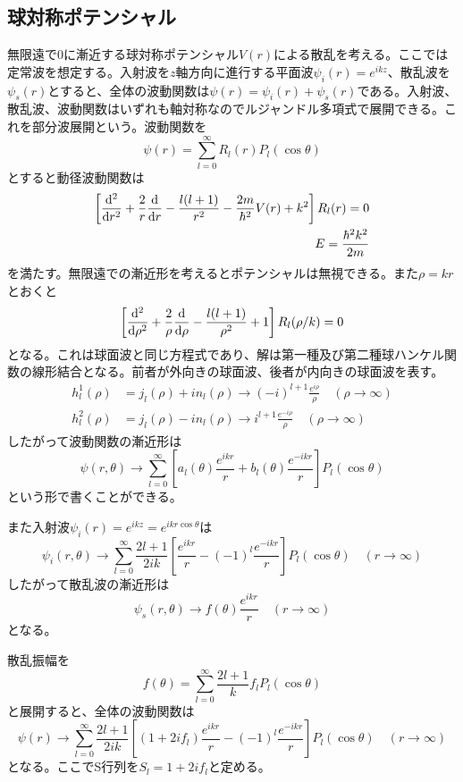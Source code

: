 \subsection{球対称ポテンシャル}
    無限遠で0に漸近する球対称ポテンシャル$V(r)$による散乱を考える。ここでは定常波を想定する。入射波を$z$軸方向に進行する平面波$\psi_i(r) = e^{ikz}$、散乱波を$\psi_s(r)$とすると、全体の波動関数は$\psi(r) = \psi_i(r) + \psi_s(r)$である。入射波、散乱波、波動関数はいずれも軸対称なのでルジャンドル多項式で展開できる。これを部分波展開という。波動関数を
        \[\psi(r) = \sum_{l = 0}^\infty R_l(r)P_l(\cos\theta)\]
    とすると動径波動関数は
    \begin{align*}
        \left[\dv[2]{r} + \frac{2}{r}\dv{r} - \frac{l(l + 1)}{r^2} - \frac{2m}{\hbar^2}V(r) + k^2\right]R_l(r) = 0\\
        E = \frac{\hbar^2k^2}{2m}
    \end{align*}
    を満たす。無限遠での漸近形を考えるとポテンシャルは無視できる。また$\rho = kr$とおくと
        \[\left[\dv[2]{\rho} + \frac{2}{\rho}\dv{\rho} - \frac{l(l + 1)}{\rho^2} + 1\right]R_l(\rho/k) = 0\]
    となる。これは球面波と同じ方程式であり、解は第一種及び第二種球ハンケル関数の線形結合となる。前者が外向きの球面波、後者が内向きの球面波を表す。
    \begin{align*}
        h_l^1(\rho) &= j_l(\rho) + in_l(\rho) \to (-i)^{l+1}\frac{e^{i\rho}}{\rho} \quad (\rho \to \infty)\\
        h_l^2(\rho) &= j_l(\rho) - in_l(\rho) \to i^{l+1}\frac{e^{-i\rho}}{\rho} \quad (\rho \to \infty)
    \end{align*}
    したがって波動関数の漸近形は
        \[\psi(r, \theta) \to \sum_{l = 0}^\infty \left[a_l(\theta)\frac{e^{ikr}}{r} + b_l(\theta)\frac{e^{-ikr}}{r}\right]P_l(\cos\theta)\]
    という形で書くことができる。
    
    また入射波$\psi_i(r) = e^{ikz} = e^{ikr\cos\theta}$は
        \[\psi_i(r, \theta) \to \sum_{l = 0}^\infty \frac{2l + 1}{2ik}\left[\frac{e^{ikr}}{r} - (-1)^l\frac{e^{-ikr}}{r}\right]P_l(\cos\theta) \quad (r \to \infty)\]
    したがって散乱波の漸近形は
        \[\psi_s(r, \theta) \to f(\theta)\frac{e^{ikr}}{r} \quad (r \to \infty)\]
    となる。

    散乱振幅を
        \[f(\theta) = \sum_{l = 0}^\infty \frac{2l + 1}{k}f_lP_l(\cos\theta)\]
    と展開すると、全体の波動関数は
        \[\psi(r) \to \sum_{l = 0}^\infty \frac{2l + 1}{2ik}\left[(1 + 2if_l)\frac{e^{ikr}}{r} - (-1)^l\frac{e^{-ikr}}{r}\right]P_l(\cos\theta) \quad (r \to \infty)\]
    となる。ここでS行列を$S_l = 1 + 2if_l$と定める。

